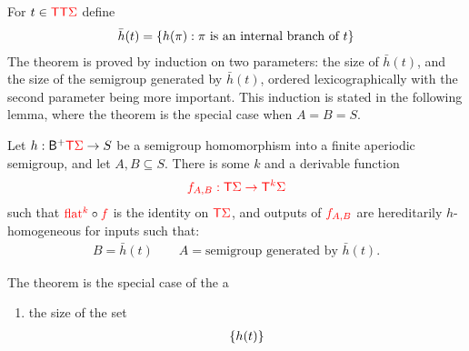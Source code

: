 \newcommand{\hint}{\bar h}
\newcommand{\hintplus}{\bar h^+}
\newcommand{\branchesplus}{\mathsf B^+}
For $t \in {\color{red}{\mathsf T}}  {\color{red}{\mathsf T}} {\color{red}{\Sigma}}$ define 
\begin{align*}
    \hint(t) = \set{h(\pi) : \text{$\pi$ is an internal branch of $t$}}
\end{align*}
The theorem is proved by induction on two parameters: the size of $\hint(t)$, and the size of the semigroup generated by $\hint(t)$, ordered lexicographically with the second parameter being more important. This induction is stated in the following lemma, where the theorem is the special case when $A=B=S$. 
\begin{lemma} Let $h : \branchesplus \tmonad \rSigma \to S$ be a semigroup homomorphism into a finite aperiodic semigroup, and let  $A,B \subseteq S$. There is some $k$ and  a derivable function
    \begin{align*}
        {\color{red}{f_{A,B}: {\color{red}{\mathsf T}}{\color{red}{\Sigma}}\to {\color{red}{\mathsf T}}^k {\color{red}{\Sigma}}}}  
    \end{align*}
    such that ${\color{red}{\mathrm{flat}}}^{{\color{red}{k}}} \circ {\color{red}{f}}$ is the identity on ${\color{red}{\mathsf T}} {\color{red}{\Sigma}}$, and   outputs of  ${\color{red}{f_{A,B}}}$ are hereditarily $h$-homogeneous for inputs such that:
    \begin{align*}
    B = \hint(t) \qquad A = \text{semigroup generated by $\hint(t)$.}
    \end{align*} 
        
\end{lemma}
The theorem is the special case of the a
\begin{enumerate}
    \item the size of the set 
    \begin{align*}
    \{h(t)\}
    \end{align*}
\end{enumerate}


